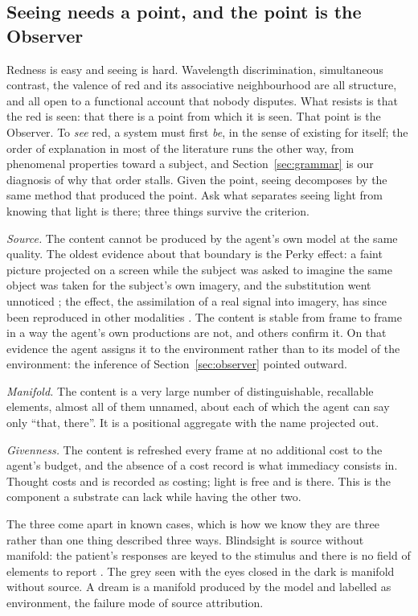 \subsection{Seeing needs a point, and the point is the Observer}
\label{sec:seeing}
\label{sec:light}

Redness is easy and seeing is hard. Wavelength discrimination, simultaneous contrast, the valence of red
and its associative neighbourhood are all structure, and all open to a functional account that nobody
disputes. What resists is that the red is seen: that there is a point from which it is seen. That point
is the Observer. To \emph{see} red, a system must first \emph{be}, in the sense of existing for itself; the order of
explanation in most of the literature runs the other way, from phenomenal properties toward a subject,
and Section~\ref{sec:grammar} is our diagnosis of why that order stalls. Given the point, seeing
decomposes by the same method that produced the point. Ask what separates seeing light from knowing
that light is there; three things survive the criterion.

\emph{Source.} The content cannot be produced by the agent's own model at the same quality. The oldest
evidence about that boundary is the Perky effect: a faint picture projected on a screen while the
subject was asked to imagine the same object was taken for the subject's own imagery, and the
substitution went unnoticed \citep{perky1910}; the effect, the assimilation of a real signal into
imagery, has since been reproduced in other modalities \citep{okada1992}. The content is stable from frame to frame in a way the
agent's own productions are not, and others confirm it. On that evidence the agent assigns it to the
environment rather than to its model of the environment: the inference of Section~\ref{sec:observer}
pointed outward.

\emph{Manifold.} The content is a very large number of distinguishable, recallable elements, almost all
of them unnamed, about each of which the agent can say only ``that, there''. It is a positional
aggregate with the name projected out.

\emph{Givenness.} The content is refreshed every frame at no additional cost to the agent's budget, and
the absence of a cost record is what immediacy consists in. Thought costs and is recorded as costing;
light is free and is there. This is the component a substrate can lack while having the other two.

The three come apart in known cases, which is how we know they are three rather than one thing
described three ways. Blindsight is source without manifold: the patient's responses are keyed to the
stimulus and there is no field of elements to report \citep{weiskrantz1986}. The grey seen with the
eyes closed in the dark is manifold without source. A dream is a manifold produced by the model and
labelled as environment, the failure mode of source attribution.

